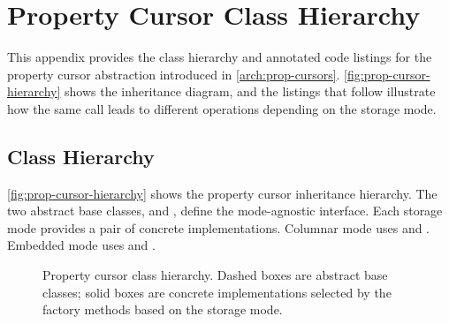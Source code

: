 \chapter{Property Cursor Class Hierarchy}
\label{chap:appendix:prop-cursors}

This appendix provides the class hierarchy and annotated code listings for the property cursor abstraction introduced in \autoref{arch:prop-cursors}.
\autoref{fig:prop-cursor-hierarchy} shows the inheritance diagram, and the listings that follow illustrate how the same  call leads to different \wt{} operations depending on the storage mode.

\section{Class Hierarchy}
\label{appendix:prop-cursor-hierarchy}

\autoref{fig:prop-cursor-hierarchy} shows the property cursor inheritance hierarchy.
The two abstract base classes,  and , define the mode-agnostic interface.
Each storage mode provides a pair of concrete implementations.
Columnar mode uses  and .
Embedded mode uses  and .

\begin{figure}[htbp]
  \centering
  \caption{Property cursor class hierarchy.  Dashed boxes are abstract base classes; solid boxes are concrete implementations selected by the  factory methods based on the storage mode.}
  \label{fig:prop-cursor-hierarchy}
\end{figure}

